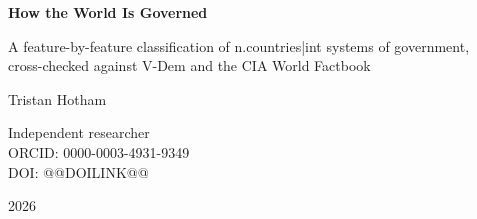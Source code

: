 \documentclass[11pt,a4paper]{article}
\begin{document}
\begin{center}
{\Large\bfseries How the World Is Governed\par}
\vspace{0.4em}
{\large A feature-by-feature classification of {{n.countries|int}} systems of government,\\cross-checked against V-Dem and the CIA World Factbook\par}
\vspace{1.2em}
{\large Tristan Hotham\par}
\vspace{0.3em}
{\small Independent researcher\\
ORCID: 0000-0003-4931-9349\\
DOI: @@DOILINK@@\par}
\vspace{0.8em}
2026
\end{center}
\end{document}
